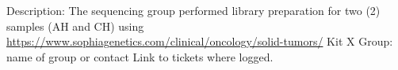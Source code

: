 \markdownRendererUlBegin
\markdownRendererUlItem Description: The sequencing group performed library preparation for two (2) samples (AH and CH) using \href{Kit X}{https://www.sophiagenetics.com/clinical/oncology/solid-tumors/} Kit X\markdownRendererUlItemEnd 
\markdownRendererUlItem Group: name of group or contact\markdownRendererUlItemEnd 
\markdownRendererUlItem Link to tickets where logged.\markdownRendererUlItemEnd 
\markdownRendererUlEnd \relax